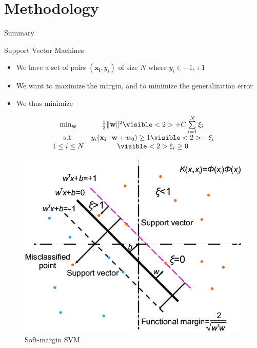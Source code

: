\documentclass[compress]{beamer}
\DeclarePairedDelimiter{\norm}{\lVert}{\rVert}
\let\vec\mathbf
\begin{document}
\section{Methodology}
\begin{frame}{Summary}
  \tableofcontents[currentsection]
\end{frame}
\begin{frame}{Support Vector Machines}
\begin{multicols}{2}
	{\begin{itemize}
		\item We have a set of pairs $(\vec{x_i},y_i)$ of size $N$ where $y_i \in {-1,+1}$
		\item We want to maximize the margin, and to minimize the generalization error
		\item We thus minimize
	\end{itemize}
	\begin{equation*}
		\begin{matrix}
		\min_\vec{w} & \frac{1}{2}\norm{\vec{w}}^{2} \visible<2>{+ C\sum\limits_{i=1}^{N}\xi_i}\\
		\textup{s.t.} & y_{i}(\vec{x_i} \cdot \vec{w} + w_{0}) \geq 1\visible<2>{-\xi_i}\\
		1 \leq i \leq N & \visible<2>{\xi_i \geq 0} 
		\end{matrix}
	\end{equation*}}
	\begin{figure}
		\includegraphics[width=\linewidth]{data/softmargin.png}
		\caption*{Soft-margin SVM \citep{softmargin}}
	\end{figure}
\end{multicols}
\end{frame}
\end{document}
